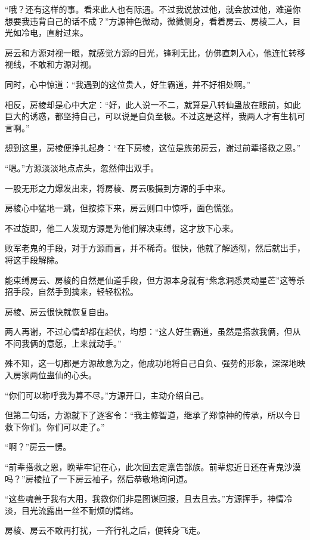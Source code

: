 
\begin{this_body}

“哦？还有这样的事。看来此人也有际遇。不过我说放过他，就会放过他，难道你想要我违背自己的话不成？”方源神色微动，微微侧身，看着房云、房棱二人，目光如冷电，直射过来。

房云和方源对视一眼，就感觉方源的目光，锋利无比，仿佛直刺入心，他连忙转移视线，不敢和方源对视。

同时，心中惊道：“我遇到的这位贵人，好生霸道，并不好相处啊。”

相反，房棱却是心中大定：“好，此人说一不二，就算是八转仙蛊放在眼前，如此巨大的诱惑，都坚持自己，可以说是自负至极。不过这是这样，我两人才有生机可言啊。”

想到这里，房棱便挣扎起身：“在下房棱，这位是族弟房云，谢过前辈搭救之恩。”

“嗯。”方源淡淡地点点头，忽然伸出双手。

一股无形之力爆发出来，将房棱、房云吸摄到方源的手中来。

房棱心中猛地一跳，但按捺下来，房云则口中惊呼，面色慌张。

不过旋即，他二人发现方源是为他们解决束缚，这才放下心来。

败军老鬼的手段，对于方源而言，并不稀奇。很快，他就了解透彻，然后就出手，将这手段解除。

能束缚房云、房棱的自然是仙道手段，但方源本身就有“紫念洞悉灵动星芒”这等杀招手段，自然手到擒来，轻轻松松。

房棱、房云很快就恢复自由。

两人再谢，不过心情却都在起伏，均想：“这人好生霸道，虽然是搭救我俩，但从不问我俩的意愿，上来就动手。”

殊不知，这一切都是方源故意为之，他成功地将自己自负、强势的形象，深深地映入房家两位蛊仙的心头。

“你们可以称呼我为算不尽。”方源开口，主动介绍自己。

但第二句话，方源就下了逐客令：“我主修智道，继承了郑惊神的传承，所以今日救下你们。你们可以走了。”

“啊？”房云一愣。

“前辈搭救之恩，晚辈牢记在心，此次回去定禀告部族。前辈您近日还在青鬼沙漠吗？”房棱拉了一下房云袖子，然后恭敬地询问道。

“这些魂兽于我有大用，我救你们非是图谋回报，且去且去。”方源挥手，神情冷淡，目光流露出一丝不耐烦的情绪。

房棱、房云不敢再打扰，一齐行礼之后，便转身飞走。


\end{this_body}
